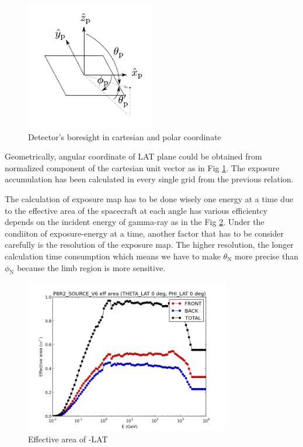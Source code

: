 \begin{figure}[h!]
    \centering
    \includegraphics[width=0.5\textwidth]{img/fig_coordinate/coord_plane.pdf}
    \caption{Detector's boresight in cartesian and polar coordinate}
    \label{fig:tf_lat_pol_car}
\end{figure}

Geometrically, angular coordinate of LAT plane could be obtained from normalized component of the cartesian unit vector as in Fig \ref{fig:tf_lat_pol_car}.
The exposure accumulation has been calculated in every single grid from the previous relation.

The calculation of exposure map has to be done wisely one energy at a time
due to the effective area of the spacecraft at each angle has various efficientcy depends on the incident energy of gamma-ray as in the Fig \ref{fig:lateff}.
Under the condiiton of exposure-energy at a time, another factor that has to be consider carefully is the resolution of the exposure map.
The higher resolution, the longer calculation time consumption which means we have to make $\theta_\text{N}$ more precise than $\phi_\text{N}$ because the limb region is more sensitive.

\begin{figure}[h!]
    \centering
    \includegraphics[width=0.8\textwidth]{img/eff_energy_dist}
    \caption{Effective area of -LAT}
    \label{fig:lateff}
\end{figure}

